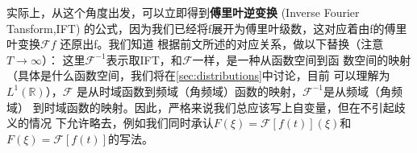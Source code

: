 \documentclass{ctexbook}
\begin{document}
实际上，从这个角度出发，可以立即得到\textbf{傅里叶逆变换} (Inverse Fourier Tansform,IFT)
的公式，因为我们已经将f展开为傅里叶级数，这对应着由f的傅里叶变换$\mathcal{F} f$
还原出f。我们知道
根据前文所述的对应关系，做以下替换（注意$T\to\infty$）：
这里$\mathcal{F} ^{-1}$表示取IFT，和$\mathcal{F} $一样，是一种从函数空间到函
数空间的映射（具体是什么函数空间，我们将在\ref{sec:distributions}中讨论，目前
可以理解为$L^1(\mathbb{R})$），$\mathcal{F} $
是从时域函数到频域（角频域）函数的映射，$\mathcal{F} ^{-1}$是从频域（角频域）
到时域函数的映射。因此，严格来说我们总应该写上自变量，但在不引起歧义的情况
下允许略去，例如我们同时承认$F(\xi)=\mathcal{F} [f(t)](\xi)$和
$F(\xi)=\mathcal{F} [f(t)]$的写法。
\end{document}
